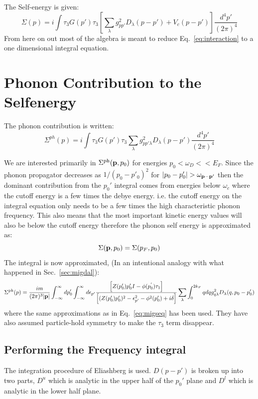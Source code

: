 \documentclass{article}
\def\p{{\bf p}}
\begin{document}
The Self-energy is given:
%
\begin{equation}
\label{eq:interaction}
\Sigma(p) = i\int \tau_{3} G(p') \tau_{3} \left[\sum_{\lambda} g^{2}_{pp'}D_{\lambda}(p-p') + V_{c}(p-p') \right] 
\frac{d^{4}p'}{(2\pi)^{4}}
\end{equation}
%
From here on out most of the algebra is meant to reduce Eq.~\ref{eq:interaction} 
to a one dimensional integral equation.

\section{Phonon Contribution to the Selfenergy}
The phonon contribution is written:
%
\begin{equation}
\Sigma^{ph}(p) = i \int \tau_{3} G(p') \tau_{3} \sum_{\lambda} g^{2}_{pp'\lambda} D_{\lambda}(p-p')\frac{d^{4}p'}{(2\pi)^{4}}
\end{equation}
%

We are interested primarily in $\Sigma^{\rm ph}(\mathbf{p},p_{0})$ for energies $p_0 < \omega_{D} << E_{F}$. 
Since the phonon propagator decreases as $1/(p_0 - p'_0)^{2}$ for $|p_0 -p'_0| > \omega_{\p-\p'}$ then
the dominant contribution from the $p_{0}'$ integral comes from energies below $\omega_{c}$ where the cutoff
energy is a few times the debye energy. i.e. the cutoff energy on the integral equation only needs to be 
a few times the high characteristic phonon frequency. This also means that the most important kinetic energy
values will also be below the cutoff energy therefore the phonon self energy is approximated as:
%
\begin{equation}
\Sigma(\p,p_{0}) =  \Sigma(p_{F},p_{0})
\end{equation}
%
The integral is now approximated, (In an intentional analogy with what happened in Sec.~\ref{sec:migdal}):
%
\begin{equation}
\Sigma^{\rm ph}(p) =  \frac{im}{(2\pi)^{3}|\p|}\int_{-\infty}^{\infty} d p'_{0} \int_{-\infty}^{\infty}d \epsilon_{p'}
\frac{\left[Z(p_{0}')p'_{0}I - \phi(p^{'}_{0})\tau_{1} \right]}{\left[ (Z(p_{0}')p_{0}')^{2} - \epsilon_{p'}^{2} -\phi^{2}(p_{0}') + i\delta \right]}\sum_{\lambda}\int_{0}^{2k_{F}}q dq g^{2}_{q\lambda} D_{\lambda}(q,p_{0} - p_{0}')
\end{equation}
%
where the same approximations as in Eq.~\ref{eq:migseq} has been used. They have
also assumed particle-hold symmetry to make the $\tau_{3}$ term disappear. 

\subsection{Performing the Frequency integral}
The integration procedure of Eliashberg is used. $D(p-p')$ is broken up into two parts,
$D^{u}$ which is analytic in the upper half of the $p_{0}'$ plane and $D^{l}$ which
is analytic in the lower half plane.
\end{document}
